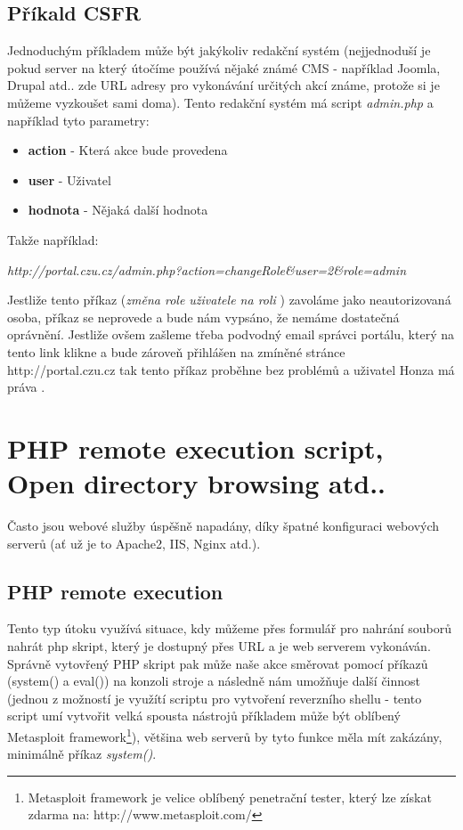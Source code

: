 \documentclass[12pt, a4paper]{report}
\begin{document}
\subsection{Příkald CSFR}
Jednoduchým příkladem může být jakýkoliv redakční systém (nejjednoduší je pokud server na který útočíme používá nějaké známé CMS - například Joomla, Drupal atd.. zde URL adresy pro vykonávání určitých akcí známe, protože si je můžeme vyzkoušet sami doma). Tento redakční systém má script \textit{admin.php} a například tyto parametry:
\begin{itemize}
\item \textbf{action} - Která akce bude provedena
\item \textbf{user} - Uživatel
\item \textbf{hodnota} - Nějaká další hodnota
\end{itemize}
Takže například:
\begin{center}
\textit{http://portal.czu.cz/admin.php?action=changeRole\&user=2\&role=admin}
\end{center}
Jestliže tento příkaz (\textit{změna role uživatele  na roli }) zavoláme jako neautorizovaná osoba, příkaz se neprovede a bude nám vypsáno, že nemáme dostatečná oprávnění. Jestliže ovšem zašleme třeba podvodný email správci portálu, který na tento link klikne a bude zároveň přihlášen na zmíněné stránce {http://portal.czu.cz} tak tento příkaz proběhne bez problémů a uživatel Honza má práva .
\section {PHP remote execution script, Open directory browsing atd..}
Často jsou webové služby úspěšně napadány, díky špatné konfiguraci webových serverů (ať už je to Apache2, IIS, Nginx atd.). 
\subsection{PHP remote execution}
Tento typ útoku využívá situace, kdy můžeme přes formulář pro nahrání souborů nahrát php skript, který je dostupný přes URL a je web serverem vykonáván. Správně vytovřený PHP skript pak může naše akce směrovat pomocí příkazů (system() a eval()) na konzoli stroje a následně nám umožňuje další činnost (jednou z možností je využítí scriptu pro vytvoření reverzního shellu - tento script umí vytvořit velká spousta nástrojů příkladem může být oblíbený Metasploit framework\footnote{Metasploit framework je velice oblíbený penetrační tester, který lze získat zdarma na: http://www.metasploit.com/}), většina web serverů by tyto funkce měla mít zakázány, minimálně příkaz \emph{system()}. 
\end{document}
